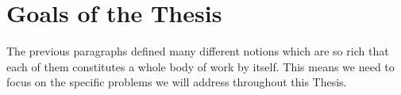 \documentclass[12pt, titlepage]{report}
\begin{document}
\newpage
\section{Goals of the Thesis}
The previous paragraphs defined many different notions which are so rich that each of them constitutes a whole body of work by itself. This means we need to focus on the specific problems we will address throughout this Thesis.
\end{document}
